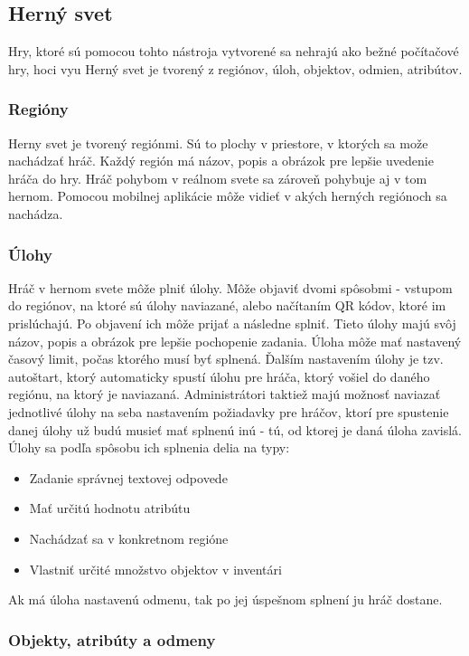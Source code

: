 \subsection{Herný svet}
Hry, ktoré sú pomocou tohto nástroja vytvorené sa nehrajú ako bežné počítačové hry, hoci vyu
Herný svet je tvorený z regiónov, úloh, objektov, odmien, atribútov.

\subsubsection{Regióny}
Herny svet je tvorený regiónmi. Sú to plochy v priestore, v ktorých sa može nachádzať hráč. Každý región má názov, popis a obrázok pre lepšie uvedenie hráča do hry. Hráč pohybom v reálnom svete sa zároveň pohybuje aj v tom hernom. Pomocou mobilnej aplikácie môže vidieť v akých herných regiónoch sa nachádza.

\subsubsection{Úlohy}
Hráč v hernom svete môže plniť úlohy. Môže objaviť dvomi spôsobmi - vstupom do regiónov, na ktoré sú úlohy naviazané, alebo načítaním QR kódov, ktoré im prislúchajú. Po objavení ich môže prijať a následne splniť. Tieto úlohy majú svôj názov, popis a obrázok pre lepšie pochopenie zadania. Úloha môže mať nastavený časový limit, počas ktorého musí byť splnená. Ďalším nastavením úlohy je tzv. autoštart, ktorý automaticky spustí úlohu pre hráča, ktorý vošiel do daného regiónu, na ktorý je naviazaná. Administrátori taktiež majú možnosť naviazať jednotlivé úlohy na seba nastavením požiadavky pre hráčov, ktorí pre spustenie danej úlohy už budú musieť mať splnenú inú - tú, od ktorej je daná úloha zavislá. Úlohy sa podľa spôsobu ich splnenia delia na typy:
\begin{itemize}
	\item Zadanie správnej textovej odpovede
	\item Mať určitú hodnotu atribútu
	\item Nachádzať sa v konkretnom regióne
	\item Vlastniť určité množstvo objektov v inventári
\end{itemize}
Ak má úloha nastavenú odmenu, tak po jej úspešnom splnení ju hráč dostane.


\subsubsection{Objekty, atribúty a odmeny}
